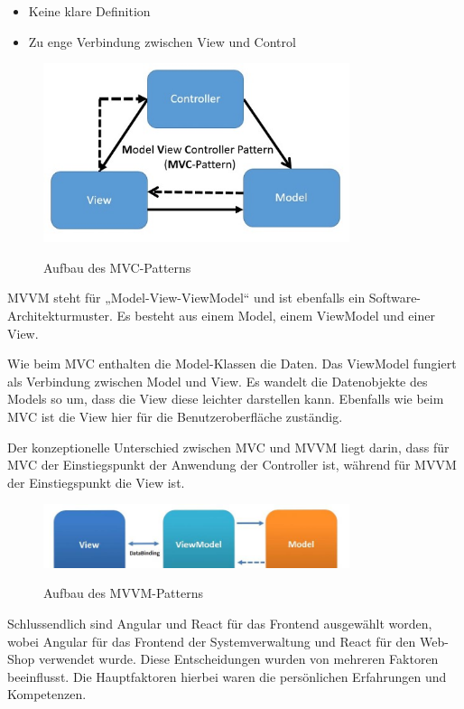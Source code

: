 \begin{itemize}
  \item Keine klare Definition
  \item Zu enge Verbindung zwischen View und Control
\end{itemize}
\cite{mvcBild} \cite{mvcVSmvvm}

\begin{figure}[H]
  \centering
  \includegraphics[width=0.8\textwidth]{pics/mvc.jpg}
  \caption{Aufbau des MVC-Patterns}
  \cite{mvcBild}
\end{figure}

MVVM steht für „Model-View-ViewModel“ und ist ebenfalls ein Software-Architekturmuster. Es besteht aus einem Model, einem ViewModel und einer View. 

Wie beim MVC enthalten die Model-Klassen die Daten. Das ViewModel fungiert als Verbindung zwischen Model und View. Es wandelt die Datenobjekte des Models so um, dass die View diese leichter darstellen kann. Ebenfalls wie beim MVC ist die View hier für die Benutzeroberfläche zuständig.

Der konzeptionelle Unterschied zwischen MVC und MVVM liegt darin, dass für MVC der Einstiegspunkt der Anwendung der Controller ist, während für MVVM der Einstiegspunkt die View ist.
\cite{mvcVSmvvm}

\begin{figure}[H]
  \centering
  \includegraphics[width=0.8\textwidth]{pics/mvvm.jpeg}
  \caption{Aufbau des MVVM-Patterns}
  \cite{mvcVSmvvm}
\end{figure}

Schlussendlich sind Angular und React für das Frontend ausgewählt worden, wobei Angular für das Frontend der Systemverwaltung und React für den Web-Shop verwendet wurde. Diese Entscheidungen wurden von mehreren Faktoren beeinflusst. Die Hauptfaktoren hierbei waren die persönlichen Erfahrungen und Kompetenzen.


